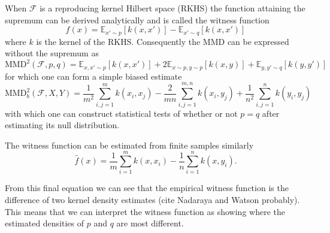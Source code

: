 \documentclass{article} %
\begin{document}
When $\mathcal{F}$ is a reproducing kernel Hilbert space (RKHS) the function attaining the supremum can be derived analytically and is called the witness function
\begin{equation}
f(x) = \mathbb{E}_{x'\sim p}[k(x,x')] - \mathbb{E}_{x'\sim q}[k(x,x')]
\end{equation}
where $k$ is the kernel of the RKHS.
Consequently the MMD can be expressed without the supremum as
\begin{equation}
  \textrm{MMD}^2(\mathcal{F},p,q) = \mathbb{E}_{x,x'\sim p}[k(x,x')] + 2\mathbb{E}_{x\sim p,y\sim p}[k(x,y)] + \mathbb{E}_{y,y'\sim q}[k(y,y')]
\end{equation}
for which one can form a simple biased estimate
\begin{equation}
  \textrm{MMD}_b^2(\mathcal{F},X,Y) = \frac{1}{m^2}\sum_{i,j=1}^{m}k(x_i,x_j) - \frac{2}{mn}\sum_{i,j=1}^{m,n}k(x_i,y_j) + \frac{1}{n^2}\sum_{i,j=1}^{n}k(y_i,y_j)
\label{eq:MMD_b}
\end{equation}
with which one can construct statistical tests of whether or not ${p=q}$ after estimating its null distribution.

The witness function can be estimated from finite samples similarly
\begin{equation}
\hat{f}(x) = \frac{1}{m}\sum_{i=1}^{m}k(x,x_i) - \frac{1}{n}\sum_{i=1}^{n}k(x,y_i).
\end{equation}

From this final equation we can see that the empirical witness function is the difference of two kernel density estimates (cite Nadaraya and Watson probably).
This means that we can interpret the witness function as showing where the estimated densities of $p$ and $q$ are most different.
\end{document}

